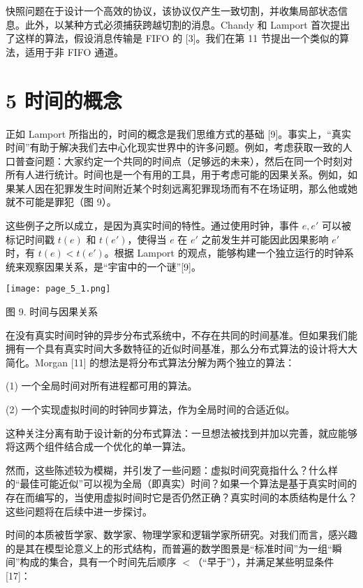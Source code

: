 \documentclass[12pt,a4paper]{report} %
\begin{document}
快照问题在于设计一个高效的协议，该协议仅产生一致切割，并收集局部状态信息。此外，以某种方式必须捕获跨越切割的消息。Chandy 和 Lamport 首次提出了这样的算法，假设消息传输是 FIFO 的 [3]。我们在第 11 节提出一个类似的算法，适用于非 FIFO 通道。

\section*{5 时间的概念}

正如 Lamport 所指出的，时间的概念是我们思维方式的基础 [9]。事实上，“真实时间”有助于解决我们去中心化现实世界中的许多问题。例如，考虑获取一致的人口普查问题：大家约定一个共同的时间点（足够远的未来），然后在同一个时刻对所有人进行统计。时间也是一个有用的工具，用于考虑可能的因果关系。例如，如果某人因在犯罪发生时间附近某个时刻远离犯罪现场而有不在场证明，那么他或她就不可能是罪犯（图 9）。

这些例子之所以成立，是因为真实时间的特性。通过使用时钟，事件 $e, e'$ 可以被标记时间戳 $t(e)$ 和 $t(e')$，使得当 $e$ 在 $e'$ 之前发生并可能因此因果影响 $e'$ 时，有 $t(e) < t(e')$。根据 Lamport 的观点，能够构建一个独立运行的时钟系统来观察因果关系，是“宇宙中的一个谜”[9]。

\begin{center}
\texttt{[image: page\_5\_1.png]}
\end{center}
\begin{center}
图 9. 时间与因果关系
\end{center}

在没有真实时间时钟的异步分布式系统中，不存在共同的时间基准。但如果我们能拥有一个具有真实时间大多数特征的近似时间基准，那么分布式算法的设计将大大简化。Morgan [11] 的想法是将分布式算法分解为两个独立的算法：

(1) 一个全局时间对所有进程都可用的算法。

(2) 一个实现虚拟时间的时钟同步算法，作为全局时间的合适近似。

这种关注分离有助于设计新的分布式算法：一旦想法被找到并加以完善，就应能够将这两个组件结合成一个优化的单一算法。

然而，这些陈述较为模糊，并引发了一些问题：虚拟时间究竟指什么？什么样的“最佳可能近似”可以视为全局（即真实）时间？如果一个算法是基于真实时间的存在而编写的，当使用虚拟时间时它是否仍然正确？真实时间的本质结构是什么？这些问题将在后续中进一步探讨。

时间的本质被哲学家、数学家、物理学家和逻辑学家所研究。对我们而言，感兴趣的是其在模型论意义上的形式结构，而普遍的数学图景是“标准时间”为一组“瞬间”构成的集合，具有一个时间先后顺序 $<$（“早于”），并满足某些明显条件 [17]：
\end{document}

